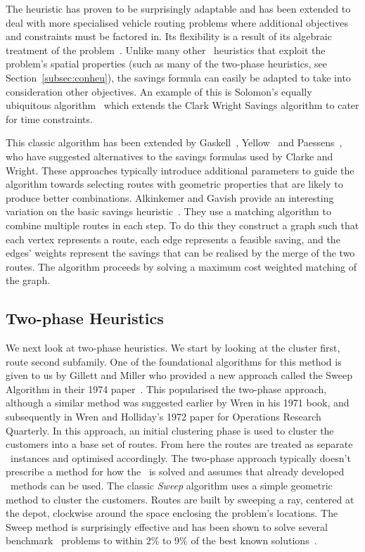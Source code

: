 The heuristic has proven to be surprisingly adaptable and has been extended to deal with more specialised vehicle routing problems where additional objectives and constraints must be factored in. Its flexibility is a result of its algebraic treatment of the problem~\cite{Laporte:1999}. Unlike many other \VRP\ heuristics that exploit the problem's spatial properties (such as many of the two-phase heuristics, see Section~\ref{subsec:conheu}), the savings formula can easily be adapted to take into consideration other objectives. An example of this is Solomon's equally ubiquitous algorithm~\cite{Solomon:1987} which extends the Clark Wright Savings algorithm to cater for time constraints. 

This classic algorithm has been extended by Gaskell~\cite{Gaskell:1967}, Yellow~\cite{Yellow:1970} and Paessens~\cite{Paessens:1988}, who have suggested alternatives to the savings formulas used by Clarke and Wright. These approaches typically introduce additional parameters to guide the algorithm towards selecting routes with geometric properties that are likely to produce better combinations. Alkinkemer and Gavish provide an interesting variation on the basic savings heuristic~\cite{AG:1991}. They use a matching algorithm to combine multiple routes in each step. To do this they construct a graph such that each vertex represents a route, each edge represents a feasible saving, and the edges' weights represent the savings that can be realised by the merge of the two routes. The algorithm proceeds by solving a maximum cost weighted matching of the graph.

\subsection{Two-phase Heuristics}
\label{sec:tph}

We next look at two-phase heuristics. We start by looking at the cluster first, route second subfamily. One of the foundational algorithms for this method is given to us by Gillett and Miller who provided a new approach called the Sweep Algorithm in their 1974 paper~\cite{GM:1974}. This popularised the two-phase approach, although a similar method was suggested earlier by Wren in his 1971 book, and subsequently in Wren and Holliday's 1972 paper for Operations Research Quarterly. In this approach, an initial clustering phase is used to cluster the customers into a base set of routes. From here the routes are treated as separate \TSP\ instances and optimised accordingly. The two-phase approach typically doesn't prescribe a method for how the \TSP\ is solved and assumes that already developed \TSP\ methods can be used. The classic \emph{Sweep} algorithm uses a simple geometric method to cluster the customers. Routes are built by sweeping a ray, centered at the depot, clockwise around the space enclosing the problem's locations. The Sweep method is surprisingly effective and has been shown to solve several benchmark \VRP\ problems to within 2\% to 9\% of the best known solutions~\cite{TV2001}.

